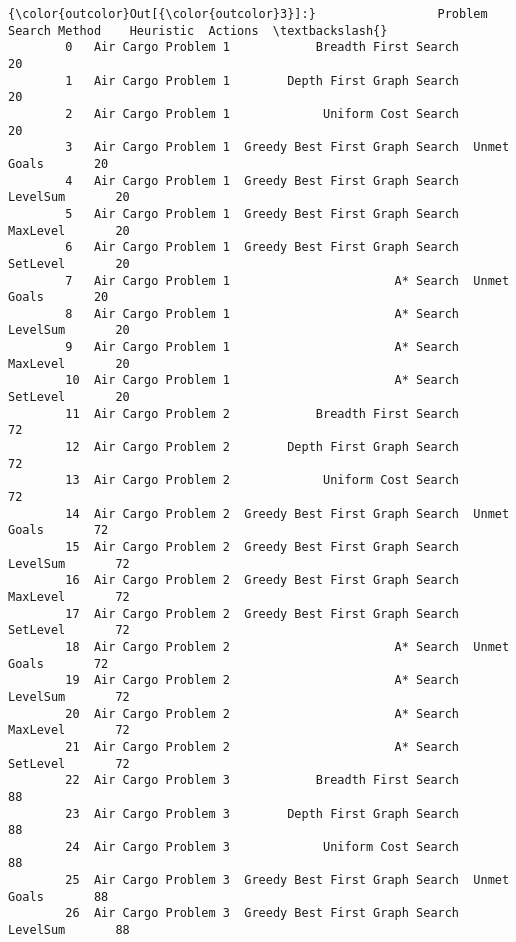 \documentclass[11pt]{article}
\begin{document}
\begin{Verbatim}[commandchars=\\\{\}]
{\color{outcolor}Out[{\color{outcolor}3}]:}                 Problem                   Search Method    Heuristic  Actions  \textbackslash{}
        0   Air Cargo Problem 1            Breadth First Search                    20   
        1   Air Cargo Problem 1        Depth First Graph Search                    20   
        2   Air Cargo Problem 1             Uniform Cost Search                    20   
        3   Air Cargo Problem 1  Greedy Best First Graph Search  Unmet Goals       20   
        4   Air Cargo Problem 1  Greedy Best First Graph Search     LevelSum       20   
        5   Air Cargo Problem 1  Greedy Best First Graph Search     MaxLevel       20   
        6   Air Cargo Problem 1  Greedy Best First Graph Search     SetLevel       20   
        7   Air Cargo Problem 1                       A* Search  Unmet Goals       20   
        8   Air Cargo Problem 1                       A* Search     LevelSum       20   
        9   Air Cargo Problem 1                       A* Search     MaxLevel       20   
        10  Air Cargo Problem 1                       A* Search     SetLevel       20   
        11  Air Cargo Problem 2            Breadth First Search                    72   
        12  Air Cargo Problem 2        Depth First Graph Search                    72   
        13  Air Cargo Problem 2             Uniform Cost Search                    72   
        14  Air Cargo Problem 2  Greedy Best First Graph Search  Unmet Goals       72   
        15  Air Cargo Problem 2  Greedy Best First Graph Search     LevelSum       72   
        16  Air Cargo Problem 2  Greedy Best First Graph Search     MaxLevel       72   
        17  Air Cargo Problem 2  Greedy Best First Graph Search     SetLevel       72   
        18  Air Cargo Problem 2                       A* Search  Unmet Goals       72   
        19  Air Cargo Problem 2                       A* Search     LevelSum       72   
        20  Air Cargo Problem 2                       A* Search     MaxLevel       72   
        21  Air Cargo Problem 2                       A* Search     SetLevel       72   
        22  Air Cargo Problem 3            Breadth First Search                    88   
        23  Air Cargo Problem 3        Depth First Graph Search                    88   
        24  Air Cargo Problem 3             Uniform Cost Search                    88   
        25  Air Cargo Problem 3  Greedy Best First Graph Search  Unmet Goals       88   
        26  Air Cargo Problem 3  Greedy Best First Graph Search     LevelSum       88   

\end{Verbatim}
\end{document}
